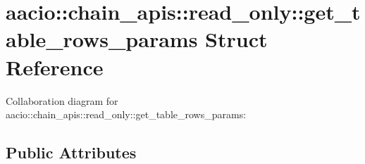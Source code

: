 \hypertarget{structaacio_1_1chain__apis_1_1read__only_1_1get__table__rows__params}{}\section{aacio\+:\+:chain\+\_\+apis\+:\+:read\+\_\+only\+:\+:get\+\_\+table\+\_\+rows\+\_\+params Struct Reference}
\label{structaacio_1_1chain__apis_1_1read__only_1_1get__table__rows__params}


Collaboration diagram for aacio\+:\+:chain\+\_\+apis\+:\+:read\+\_\+only\+:\+:get\+\_\+table\+\_\+rows\+\_\+params\+:
\subsection*{Public Attributes}
